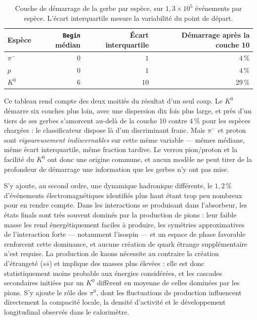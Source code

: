 \begin{table}[!ht]
\centering
\caption{Couche de démarrage de la gerbe par espèce, sur $1{,}3\times10^{5}$ événements par espèce. L'écart interquartile mesure la variabilité du point de départ.}
\label{tab:pid_begin}
\small
\begin{tabular}{lrrr}
\toprule
Espèce & \texttt{Begin} médian & Écart interquartile & Démarrage après la couche 10 \\
\midrule
$\pi^-$ & $0$ & $1$  & $4\,\%$ \\
$p$     & $0$ & $1$  & $4\,\%$ \\
$K^0$   & $6$ & $10$ & $29\,\%$ \\
\bottomrule
\end{tabular}
\end{table}

Ce tableau rend compte des deux moitiés du résultat d'un seul coup. Le $K^0$ démarre six couches plus loin, avec une dispersion dix fois plus large, et près d'un tiers de ses gerbes s'amorcent au-delà de la couche 10 contre $4\,\%$ pour les espèces chargées : le classificateur dispose là d'un discriminant franc. Mais $\pi^-$ et proton sont \emph{rigoureusement indiscernables} sur cette même variable — mêmes médiane, même écart interquartile, même fraction tardive. Le verrou pion/proton et la facilité du $K^0$ ont donc une origine commune, et aucun modèle ne peut tirer de la profondeur de démarrage une information que les gerbes n'y ont pas mise.

S'y ajoute, au second ordre, une dynamique hadronique différente, le $1{,}2\,\%$ d'événements électromagnétiques identifiés plus haut étant trop peu nombreux pour en rendre compte. Dans les interactions se produisant dans l'absorbeur, les états finals sont très souvent dominés par la production de pions : leur faible masse les rend énergétiquement faciles à produire, les symétries approximatives de l'interaction forte — notamment l'isospin — et un espace de phase favorable renforcent cette dominance, et aucune création de quark étrange supplémentaire n'est requise. La production de kaons nécessite au contraire la création d'étrangeté ($s\bar{s}$) et implique des masses plus élevées : elle est donc statistiquement moins probable aux énergies considérées, et les cascades secondaires initiées par un $K^0$ diffèrent en moyenne de celles dominées par les pions. S'y ajoute le rôle des $\pi^0$, dont les fluctuations de production influencent directement la compacité locale, la densité d'activité et le développement longitudinal observés dans le calorimètre.

